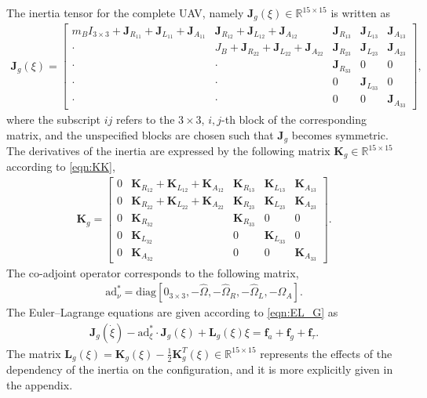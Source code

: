 \documentclass[10pt]{article}
\renewcommand{\Re}{\ensuremath{\mathbb{R}}}
\newcommand{\ad}{\ensuremath{\mathrm{ad}}}
\begin{document}
The inertia tensor for the complete UAV, namely $\mathbf{J}_g(\xi)\in\Re^{15\times 15}$ is written as
\begin{align}
    \mathbf{J}_g(\xi) = \begin{bmatrix}
        m_B I_{3\times 3} + \mathbf{J}_{R_{11}} + \mathbf{J}_{L_{11}} + \mathbf{J}_{A_{11}}
        & \mathbf{J}_{R_{12 }} + \mathbf{J}_{L_{12}} + \mathbf{J}_{A_{12}}
        & \mathbf{J}_{R_{13 }}
        & \mathbf{J}_{L_{13}} 
        & \mathbf{J}_{A_{13}} \\
        \cdot & J_B + \mathbf{J}_{R_{22}} + \mathbf{J}_{L_{22}} + \mathbf{J}_{A_{22}}
        & \mathbf{J}_{R_{23}} 
        & \mathbf{J}_{L_{23}} 
        & \mathbf{J}_{A_{23}} \\
        \cdot & \cdot &  \mathbf{J}_{R_{33}}
              & 0 & 0 \\
        \cdot & \cdot & 0
              & \mathbf{J}_{L_{33}} & 0 \\
        \cdot & \cdot & 0 & 0 & \mathbf{J}_{A_{33}}
    \end{bmatrix},
\end{align}
where the subscript $ij$ refers to the $3\times 3$, $i,j$-th block of the corresponding matrix, and the unspecified blocks are chosen such that $\mathbf{J}_g$ becomes symmetric.
The derivatives of the inertia are expressed by the following matrix $\mathbf{K}_g\in\Re^{15\times 15}$ according to \eqref{eqn:KK}, 
\begin{align}
    \mathbf{K}_g = \begin{bmatrix}
        0 & \mathbf{K}_{R_{12}} + \mathbf{K}_{L_{12}} + \mathbf{K}_{A_{12}} & \mathbf{K}_{R_{13}} & \mathbf{K}_{L_{13}} & \mathbf{K}_{A_{13}}\\
        0 & \mathbf{K}_{R_{22}} + \mathbf{K}_{L_{22}} + \mathbf{K}_{A_{22}} & \mathbf{K}_{R_{23}} & \mathbf{K}_{L_{23}} & \mathbf{K}_{A_{23}} \\
        0 & \mathbf{K}_{R_{32}} & \mathbf{K}_{R_{33}} & 0 & 0 \\
        0 & \mathbf{K}_{L_{32}} & 0 & \mathbf{K}_{L_{33}} & 0 \\
        0 & \mathbf{K}_{A_{32}} & 0 & 0 & \mathbf{K}_{A_{33}}
    \end{bmatrix}.
\end{align}
The co-adjoint operator corresponds to the following matrix,
\begin{align}
    \mathrm{ad}^*_\nu = \mathrm{diag}[0_{3\times 3}, -\hat\Omega, -\hat\Omega_R, -\hat\Omega_L, - \hat\Omega_A].
\end{align}
The Euler--Lagrange equations are given according to \eqref{eqn:EL_G} as
\begin{gather}
    \mathbf{J}_g(\dot \xi) - \ad^*_\xi \cdot \mathbf{J}_g(\xi) + \mathbf{L}_g(\xi) \xi  = \mathbf{f}_a + \mathbf{f}_g + \mathbf{f}_\tau. \label{eqn:EL}
\end{gather}
The matrix  $\mathbf{L}_g(\xi) = \mathbf{K}_g(\xi)  - \frac{1}{2}\mathbf{K}^T_g(\xi)\in\Re^{15\times 15}$ represents the effects of the dependency of the inertia on the configuration, 
and it is more explicitly given in the appendix. 
\end{document}
